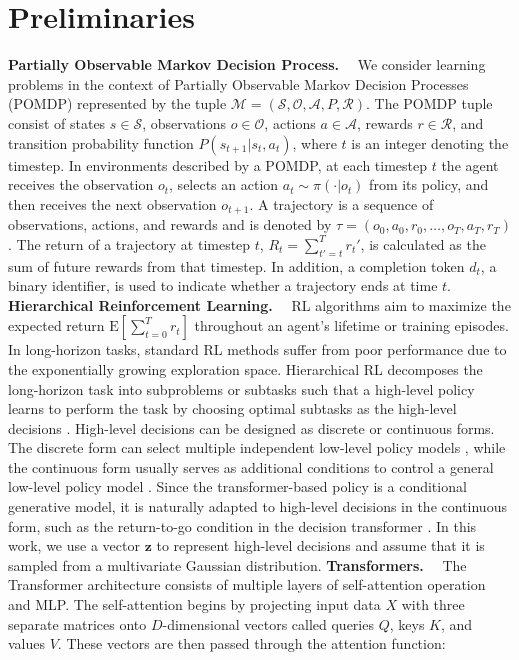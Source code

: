 \documentclass{article}
\theoremstyle{plain}
\theoremstyle{definition}
\theoremstyle{remark}
\begin{document}
\section{Preliminaries}
\noindent\textbf{Partially Observable Markov Decision Process.}~~
We consider learning problems in the context of Partially Observable Markov Decision Processes (POMDP) represented by the tuple $\mathcal{M}=(\mathcal{S,O,A},P, \mathcal{R})$. The POMDP tuple consist of states $s\in \mathcal{S} $, observations $o\in \mathcal{O} $, actions $a\in \mathcal{A} $, rewards $r\in \mathcal{R} $, and transition probability function $P (s_{t+1}|s_t,a_t)$, where $t$ is an integer denoting the timestep. In environments described by a POMDP, at each timestep $t$ the agent receives the observation $o_t$, selects an action $a_t \sim \pi(\cdot|o_t)$ from its policy, and then receives the next observation $o_{t+1}$. A trajectory is a sequence of observations, actions, and rewards and is denoted by $\tau=(o_0,a_0,r_0,\dots,o_T,a_T,r_T)$. The return of a trajectory at timestep $t$, $R_t = \sum_{t'=t}^Tr_t'$, is calculated as the sum of future rewards from that timestep.
In addition, a completion token $d_t$, a binary identifier, is used to indicate whether a trajectory ends at time $t$.
\noindent\textbf{Hierarchical Reinforcement Learning.}~~
RL algorithms aim to maximize the expected return $\mathrm{E}[\sum_{t=0}^Tr_t]$ throughout an agent's lifetime or training episodes. In long-horizon tasks, standard RL methods suffer from poor performance due to the exponentially growing exploration space. Hierarchical RL decomposes the long-horizon task into subproblems or subtasks such that a high-level policy learns to perform the task by choosing optimal subtasks as the high-level decisions \cite{18}. High-level decisions can be designed as discrete or continuous forms. The discrete form can select multiple independent low-level policy models \cite{19}, while the continuous form usually serves as additional conditions to control a general low-level policy model \cite{10}. Since the transformer-based policy is a conditional generative model, it is naturally adapted to high-level decisions in the continuous form, such as the return-to-go condition in the decision transformer \cite{2}. In this work, we use a vector $\textbf{z}$ to represent high-level decisions and assume that it is sampled from a multivariate Gaussian distribution.
\noindent\textbf{Transformers.}~~
The Transformer \cite{4} architecture consists of multiple layers of self-attention operation and MLP. The self-attention begins by projecting input data $X$ with three separate matrices onto $D$-dimensional vectors called queries $Q$, keys $K$, and values $V$. These vectors are then passed through the attention function:
\end{document}
